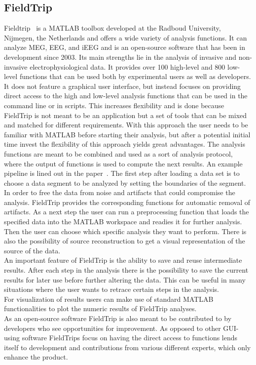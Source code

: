 \subsection{FieldTrip}
Fieldtrip~\cite{fieldtrip} is a MATLAB toolbox developed at the Radboud University,  Nijmegen,  the Netherlands and offers a wide variety of analysis functions.  It can analyze MEG, EEG, and iEEG and is an open-source software that has been in development since 2003. Its main strengths lie in the analysis of invasive and non-invasive electrophysiological data. It provides over 100 high-level and 800 low-level functions that can be used both by experimental users as well as developers. It does not feature a graphical user interface, but instead focuses on providing direct access to the high and low-level analysis functions that can be used in the command line or in scripts.  This increases flexibility and is done because FieldTrip is not meant to be an application but a set of tools that can be mixed and matched for different requirements.
With this approach the user needs to be familiar with MATLAB before starting their analysis, but after a potential initial time invest the flexibility of this approach yields great advantages.
The analysis functions are meant to be combined and used as a sort of analysis protocol, where the output of functions is used to compute the next results. 
An example pipeline is lined out in the paper~\cite{fieldtrip}. The first step after loading a data set is to choose a data segment to be analyzed by setting the boundaries of the segment. In order to free the data from noise and artifacts that could compromise the analysis. FieldTrip provides the corresponding functions for automatic removal of artifacts. As a next step the user can run a preprocessing function that loads the specified data into the MATLAB workspace and readies it for further analysis. Then the user can choose which specific analysis they want to perform. There is also the possibility of source reconstruction to get a visual representation of the source of the data.\\
An important feature of FieldTrip is the ability to save and reuse intermediate results. After each step in the analysis there is the possibility to save the current results for later use before further altering the data. This can be useful in many situations where the user wants to retrace certain steps in the analysis.\\
For visualization of results users can make use of standard MATLAB functionalities to plot the numeric results of FieldTrip analyses.\\
As an open-source software FieldTrip is also meant to be contributed to by developers who see opportunities for improvement. As opposed to other GUI-using software FieldTrips focus on having the direct access to functions lends itself to development and contributions from various different experts, which only enhance the product.

